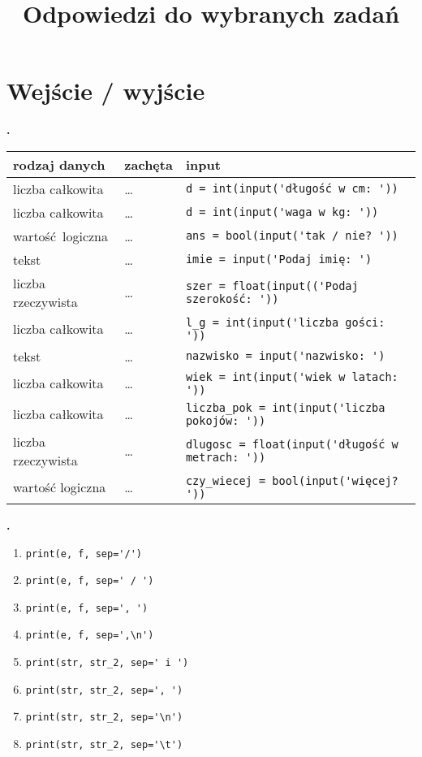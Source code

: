 \documentclass[a4paper]{article}
\title{Odpowiedzi do wybranych zadań}
\begin{document}
\maketitle
\tableofcontents

\setcounter{zadanie}{1}

\section{Wejście / wyjście}
\textbf{.}\addtocounter{zadanie}{1}

\begin{tabular}{l|l|l}
\textsf{rodzaj danych} & \textsf{zachęta} & \textsf{input} \\\hline
liczba całkowita & \dots & \verb|d = int(input('długość w cm: '))|\\\hline
liczba całkowita & \dots & \verb|d = int(input('waga w kg: '))|\\\hline
wartość logiczna & \dots & \verb|ans = bool(input('tak / nie? '))|\\\hline
tekst & \dots & \verb|imie = input('Podaj imię: ')| \\\hline
liczba rzeczywista & \dots & \verb|szer = float(input(('Podaj szerokość: '))| \\\hline
liczba całkowita & \dots & \verb|l_g = int(input('liczba gości: '))| \\\hline
tekst & \dots & \verb|nazwisko = input('nazwisko: ')| \\\hline
liczba całkowita & \dots & \verb|wiek = int(input('wiek w latach: '))| \\\hline
liczba całkowita & \dots & \verb|liczba_pok = int(input('liczba pokojów: '))| \\\hline
liczba rzeczywista & \dots & \verb|dlugosc = float(input('długość w metrach: '))| \\\hline
wartość logiczna & \dots & \verb|czy_wiecej = bool(input('więcej? '))|
\end{tabular}

\textbf{.}\addtocounter{zadanie}{1}
\begin{multicols}{2}
\begin{enumerate}[label=\arabic*.]
    \item \verb|print(e, f, sep='/')|
    \item \verb|print(e, f, sep=' / ')|
    \item \verb|print(e, f, sep=', ')|
    \item \verb|print(e, f, sep=',\n')|
    \item \verb|print(str, str_2, sep=' i ')|
    \item \verb|print(str, str_2, sep=', ')|
    \item \verb|print(str, str_2, sep='\n')|
    \item \verb|print(str, str_2, sep='\t')|
\end{enumerate}
\end{multicols}
\end{document}

